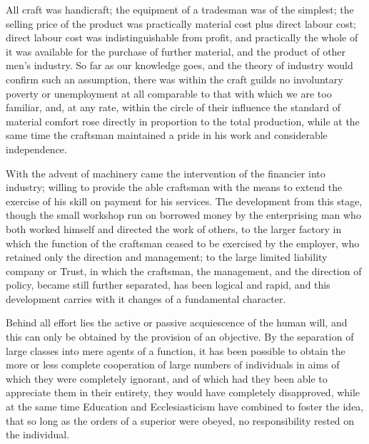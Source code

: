 \documentclass{book}
\begin{document}
All craft was handicraft; the equipment of a tradesman was of the simplest; the selling price of the product was practically material cost plus direct labour cost; direct labour cost was indistinguishable from profit, and practically the whole of it was available for the purchase of further material, and the product of other men’s industry. So far as our knowledge goes, and the theory of industry would confirm such an assumption, there was within the craft guilds no involuntary poverty or unemployment at all comparable to that with which we are too familiar, and, at any rate, within the circle of their influence the standard of material comfort rose directly in proportion to the total production, while at the same time the craftsman maintained a pride in his work and considerable independence.

With the advent of machinery came the intervention of the financier into industry; willing to provide the able craftsman with the means to extend the exercise of his skill on payment for his services. The development from this stage, though the small workshop run on borrowed money by the enterprising man who both worked himself and directed the work of others, to the larger factory in which the function of the craftsman ceased to be exercised by the employer, who retained only the direction and management; to the large limited liability company or Trust, in which the craftsman, the management, and the direction of policy, became still further separated, has been logical and rapid, and this development carries with it changes of a fundamental character.

Behind all effort lies the active or passive acquiescence of the human will, and this can only be obtained by the provision of an objective. By the separation of large classes into mere agents of a function, it has been possible to obtain the more or less complete cooperation of large numbers of individuals in aims of which they were completely ignorant, and of which had they been able to appreciate them in their entirety, they would have completely disapproved, while at the same time Education and Ecclesiasticism have combined to foster the idea, that so long as the orders of a superior were obeyed, no responsibility rested on the individual.
\end{document}
